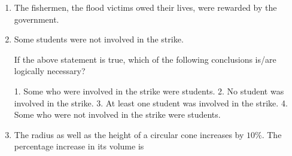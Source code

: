 \documentclass[journal,12pt,onecolumn]{IEEEtran}
\theoremstyle{remark}
\begin{document}
\begin{enumerate}[start=1, label=Q.\arabic*]


\item The fishermen, the flood victims owed their lives, were rewarded by the government.  
\begin{enumerate}
\end{enumerate}

\hfill{}


\item Some students were not involved in the strike.  

If the above statement is true, which of the following conclusions is/are logically necessary?  

1. Some who were involved in the strike were students.  
2. No student was involved in the strike.  
3. At least one student was involved in the strike.  
4. Some who were not involved in the strike were students.  

\begin{enumerate}
\end{enumerate}

\hfill{}


\item The radius as well as the height of a circular cone increases by $10\%$.  
The percentage increase in its volume is  
\begin{enumerate}
\end{enumerate}

\hfill{}



\end{enumerate}
\end{document}
